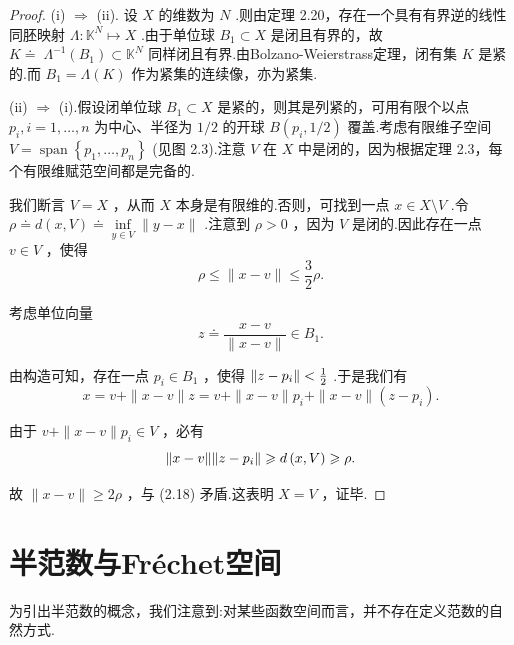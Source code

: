 \begin{proof}
(i) $\Rightarrow$ (ii). 设 $X$ 的维数为 $N$ .则由定理 2.20，存在一个具有有界逆的线性同胚映射 $\Lambda  : {\mathbb{K}}^{N} \mapsto  X$ .由于单位球 ${B}_{1} \subset  X$ 是闭且有界的，故 $K \doteq \; {\Lambda }^{-1}\left( {B}_{1}\right)  \subset  {\mathbb{K}}^{N}$ 同样闭且有界.由Bolzano-Weierstrass定理，闭有集 $K$ 是紧的.而 ${B}_{1} = \Lambda \left( K\right)$ 作为紧集的连续像，亦为紧集.

(ii) $\Rightarrow$ (i).假设闭单位球 ${B}_{1} \subset  X$ 是紧的，则其是列紧的，可用有限个以点 ${p}_{i},i = 1,\ldots ,n$ 为中心、半径为 $1/2$ 的开球 $B\left( {{p}_{i},1/2}\right)$ 覆盖.考虑有限维子空间 $V = \operatorname{span}\left\{  {{p}_{1},\ldots ,{p}_{n}}\right\}$ (见图 2.3).注意 $V$ 在 $X$ 中是闭的，因为根据定理 2.3，每个有限维赋范空间都是完备的.

我们断言 $V = X$ ，从而 $X$ 本身是有限维的.否则，可找到一点 $x \in  X \setminus  V$ .令 $\rho  \doteq  d\left( {x,V}\right)  \doteq  \mathop{\inf }\limits_{{y \in  V}}\| y - x\|$ .注意到 $\rho  > 0$ ，因为 $V$ 是闭的.因此存在一点 $v \in  V$ ，使得
\begin{equation}\tag{2.18}
\rho  \leq  \| x - v\|  \leq  \frac{3}{2}\rho .
\end{equation}

考虑单位向量
\[
z \doteq  \frac{x - v}{\| x - v\| } \in  {B}_{1}.
\]

由构造可知，存在一点 ${p}_{i} \in  {B}_{1}$ ，使得 $\norm{z - {p}_{i}} < \frac{1}{2}$ .于是我们有
\[
x = v + \| x - v\| z = v + \| x - v\| {p}_{i} + \| x - v\| \left( {z - {p}_{i}}\right) .
\]

由于 $v + \| x - v\| {p}_{i} \in  V$ ，必有
\[
\| x - v\| \norm{z - {p}_{i}} \geqslant  d\left( {x,V}\right)  \geqslant  \rho .
\]

故 $\| x - v\|  \geq  {2\rho }$ ，与 (2.18) 矛盾.这表明 $X = V$ ，证毕.
\end{proof}

\section{半范数与Fréchet空间}

为引出半范数的概念，我们注意到:对某些函数空间而言，并不存在定义范数的自然方式.

